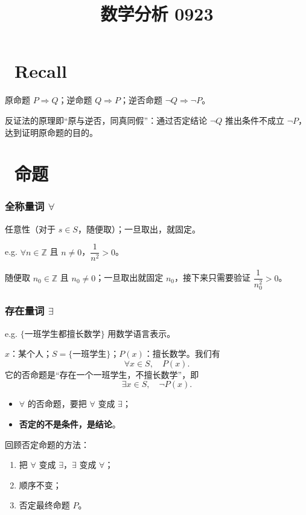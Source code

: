 \documentclass[UTF8,11pt]{ctexart}
\title{数学分析 0923}
\date{}
\theoremstyle{cnthm}
\begin{document}
\maketitle

\section{\ Recall}

原命题 $P\Rightarrow Q$；逆命题 $Q\Rightarrow P$；逆否命题 $\neg Q\Rightarrow\neg P$。

反证法的原理即“原与逆否，同真同假”：通过否定结论 $\neg Q$ 推出条件不成立 $\neg P$，
达到证明原命题的目的。

\section{\ 命题}

\subsubsection*{全称量词 $\forall$}

任意性（对于 $s\in S$，随便取）；一旦取出，就固定。

e.g. $\forall n\in\mathbb Z$ 且 $n\neq0$，$\dfrac{1}{n^2}>0$。

随便取 $n_0\in\mathbb Z$ 且 $n_0\neq0$；一旦取出就固定 $n_0$，接下来只需要验证
$\dfrac{1}{n_0^2}>0$。

\subsubsection*{存在量词 $\exists$}

e.g. $\{$一班学生都擅长数学$\}$ 用数学语言表示。

$x$：某个人；$S=\{$一班学生$\}$；$P(x)$：擅长数学。我们有
\[
\forall x\in S,\quad P(x).
\]
它的否命题是“存在一个一班学生，不擅长数学”，即
\[
\exists x\in S,\quad \neg P(x).
\]

\begin{itemize}
\item $\forall$ 的否命题，要把 $\forall$ 变成 $\exists$；
\item \textbf{否定的不是条件，是结论}。
\end{itemize}

回顾否定命题的方法：

\begin{enumerate}
\item 把 $\forall$ 变成 $\exists$，$\exists$ 变成 $\forall$；
\item 顺序不变；
\item 否定最终命题 $P$。
\end{enumerate}
\end{document}
